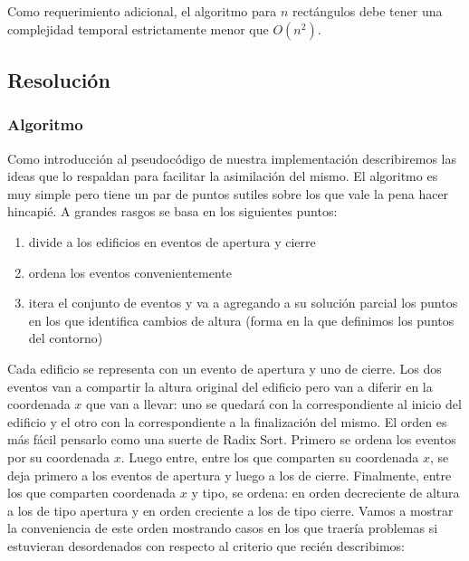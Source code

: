 Como requerimiento adicional, el algoritmo para $n$ rectángulos debe tener una complejidad temporal estrictamente menor que $O(n^2)$.

\subsection{Resoluci\'on}
\subsubsection{Algoritmo}
Como introducción al pseudocódigo de nuestra implementación describiremos las ideas que lo respaldan para facilitar 
la asimilación del mismo. El algoritmo es muy simple pero tiene un par de puntos sutiles sobre los
que vale la pena hacer hincapié. A grandes rasgos se basa en los siguientes puntos:
\begin{enumerate}
	\item divide a los edificios en eventos de apertura y cierre
	\item ordena los eventos convenientemente
	\item itera el conjunto de eventos y va a agregando a su solución parcial los puntos en los que
	identifica cambios de altura (forma en la que definimos los puntos del contorno)
\end{enumerate} 
Cada edificio se representa con un evento de apertura y uno de cierre. Los dos eventos van a compartir la altura
original del edificio pero van a diferir en la coordenada $x$ que van a llevar: uno se quedará con la correspondiente
al inicio del edificio y el otro con la correspondiente a la finalización del mismo. 
El orden es más fácil pensarlo como una suerte de Radix Sort. Primero se ordena los eventos por su coordenada
$x$. Luego entre, entre los que comparten su coordenada $x$, se deja primero a los eventos de apertura y luego
a los de cierre. Finalmente, entre los que comparten coordenada $x$ y tipo, se ordena: en orden decreciente de altura
a los de tipo apertura y en orden creciente a los de tipo cierre. Vamos a mostrar la conveniencia de este orden
mostrando casos en los que traería problemas si estuvieran desordenados con respecto al criterio que recién describimos:
